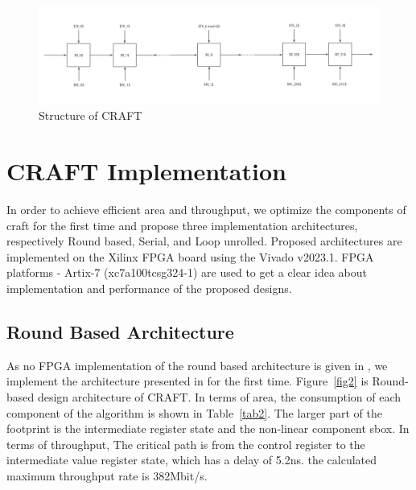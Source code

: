\documentclass[sn-basic]{sn-jnl}%
\begin{document}
\begin{figure}[h]%
    \caption{Structure of CRAFT}\label{fig1}
    \centering
    \includegraphics[width=\textwidth]{struct_of_craft.png}
\end{figure}


\section{CRAFT Implementation}\label{sec3}

In order to achieve efficient area and throughput, we optimize the components of craft for the first time and propose three implementation architectures, respectively Round based, Serial, and Loop unrolled. Proposed architectures are implemented on the Xilinx FPGA board using the Vivado v2023.1. FPGA platforms - Artix-7 (xc7a100tcsg324-1) are used to get a clear idea about implementation and performance of the proposed designs.

\subsection{Round Based Architecture}\label{subsec1}
As no FPGA implementation of the round based architecture is given in \cite{bib5}, we implement the architecture presented in \cite{bib5} for the first time. Figure~\ref{fig2} is Round-based design architecture of CRAFT. In terms of area, the consumption of each component of the algorithm is shown in Table~\ref{tab2}. The larger part of the footprint is the intermediate register state and the non-linear component sbox. In terms of throughput, The critical path is from the control register to the intermediate value register state, which has a delay of 5.2ns. the calculated maximum throughput rate is 382Mbit/s.
\end{document}
